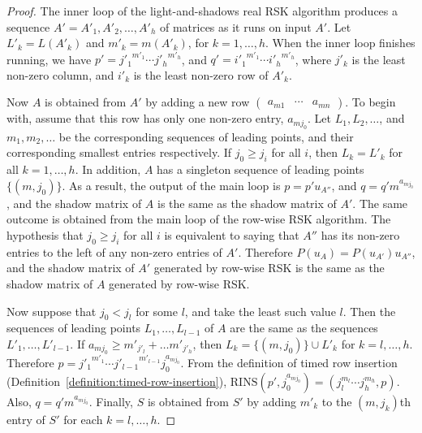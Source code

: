 \documentclass[10pt]{amsproc}
\theoremstyle{definition}
\theoremstyle{remark}
\newcommand{\rowins}{\mathrm{RINS}}
\begin{document}
\begin{proof}
  The inner loop of the light-and-shadows real RSK algorithm produces a sequence $A'=A'_1, A'_2,\dotsc, A'_h$ of matrices as it runs on input $A'$.
  Let $L'_k=L(A'_k)$ and $m'_k=m(A'_k)$, for $k=1,\dotsc,h$.
  When the inner loop finishes running, we have $p'={j'_1}^{m'_1}\dotsb {j'_h}^{m'_h}$, and $q' = {i'_1}^{m'_1}\dotsb {i'_h}^{m'_h}$, where $j'_k$ is the least non-zero column, and $i'_k$ is the least non-zero row of $A'_k$.


  Now $A$ is obtained from $A'$ by adding a new row
  $
  \begin{pmatrix}
    a_{m1}&\dotsb & a_{mn}
  \end{pmatrix}
  $.
  To begin with, assume that this row has only one non-zero entry, $a_{mj_0}$.
  Let $L_1,L_2,\dotsc$, and $m_1,m_2,\dotsc$ be the corresponding sequences of leading points, and their corresponding smallest entries respectively.
  If $j_0\geq j_i$ for all $i$, then $L_k=L'_k$ for all $k=1,\dotsc,h$.
  In addition, $A$ has a singleton sequence of leading points $\{(m,j_0)\}$.
  As a result, the output of the main loop is $p=p'u_{A''}$, and $q=q'm^{a_{mj_0}}$, and the shadow matrix of $A$ is the same as the shadow matrix of $A'$.
  The same outcome is obtained from the main loop of the row-wise RSK algorithm.
  The hypothesis that $j_0\geq j_i$ for all $i$ is equivalent to saying that $A''$ has its non-zero entries to the left of any non-zero entries of $A'$.
  Therefore $P(u_A)=P(u_{A'})u_{A''}$, and the shadow matrix of $A'$ generated by row-wise RSK is the same as the shadow matrix of $A$ generated by row-wise RSK.
  
  Now suppose that $j_0<j_l$ for some $l$, and take the least such value $l$.
  Then the sequences of leading points $L_1,\dotsc,L_{l-1}$ of $A$ are the same as the sequences $L'_1,\dotsc,L'_{l-1}$.
  If $a_{mj_0}\geq m'_{j'_l}+\dots m'_{j'_h}$, then $L_k=\{(m,j_0)\}\cup L'_k$ for $k=l,\dotsc, h$.
  Therefore $p={j'_1}^{m'_1}\dotsb {j'_{l-1}}^{m'_{l-1}}j_0^{a_{mj_0}}$.
  From the definition of timed row insertion (Definition~\ref{definition:timed-row-insertion}), $\rowins(p',j_0^{a_{mj_0}}) = (j_l^{m_l}\dotsb j_h^{m_h},p)$.
  Also, $q=q'm^{a_{mj_0}}$.
  Finally, $S$ is obtained from $S'$ by adding $m'_k$ to the $(m,j_k)$th entry of $S'$ for each $k=l,\dotsc,h$.


\end{proof}
\end{document}

